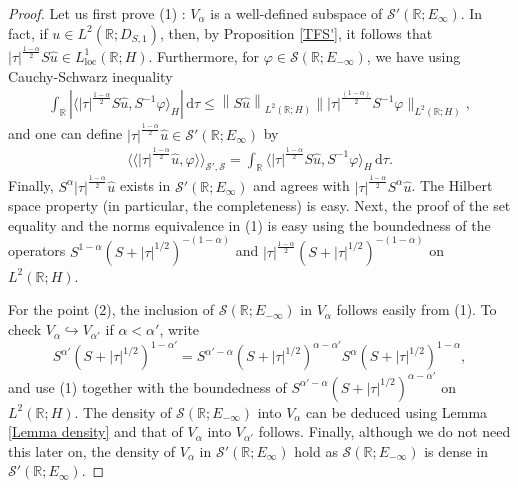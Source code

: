 \documentclass[11pt, letterpaper]{amsart}
\theoremstyle{definition}
\theoremstyle{remark}
\newcommand{\llangle}{\langle\!\langle}
\newcommand{\rrangle}{\rangle\!\rangle}
\numberwithin{equation}{section}
\begin{document}
\begin{proof} Let us first prove (1) : $V_\alpha $ is a well-defined  subspace of  $\mathcal{S'}(\mathbb{R};E_\infty)$. In fact, if $u \in L^2(\mathbb{R};D_{S,1})$, then, by Proposition \ref{TFS'}, it follows that $ \left | \tau  \right |^{\frac{1-\alpha}{2}} S \hat{u} \in L^1_{\mathrm{loc}}(\mathbb{R};H)$. Furthermore, for $\varphi \in \mathcal{S}(\mathbb{R};E_{-\infty})$, we have using Cauchy-Schwarz inequality
\begin{align*}
     \int_{\mathbb{R}}  |\langle \left | \tau  \right |^{\frac{1-\alpha}{2}} S\hat{u}, S^{-1 }\varphi  \rangle_H |\, \mathrm d \tau  \leq \left \| S\hat{u} \right \|_{L^2(\mathbb{R};H)}   \||\tau|^{\frac{(1-\alpha)}{2}}  S^{-1 }\varphi   \|_{L^2(\mathbb{R};H)} , 
\end{align*}
and one can define $\left | \tau  \right |^{{\frac{1-\alpha}{2}}}\hat u \in \mathcal{S'}(\mathbb{R};E_\infty)$ by
\begin{align*}
 \llangle \left | \tau  \right |^{\frac{1-\alpha}{2}}\hat u, \varphi  \rrangle_{\mathcal{S'},\mathcal{S}} =  \int_{\mathbb{R}}  \langle \left | \tau  \right |^{\frac{1-\alpha}{2}} S\hat{u}, S^{-1 }\varphi  \rangle_H\,  \mathrm d \tau . 
\end{align*}
Finally, $ S^\alpha\left | \tau  \right |^{{\frac{1-\alpha}{2}}}\hat u$ exists in $\mathcal{S'}(\mathbb{R};E_\infty)$ and agrees with $ \left | \tau  \right |^{{\frac{1-\alpha}{2}}}S^\alpha\hat u$. The Hilbert space property (in particular, the completeness) is easy.
Next, the proof of the set equality and the norms equivalence in (1) is easy using the boundedness of the operators $S^{1-\alpha}(S+\left | \tau \right |^{1/2})^{-(1-\alpha)}$ and $|\tau|^{\frac{1-\alpha }2}(S+\left | \tau \right |^{1/2})^{-(1-\alpha)}$ on $L^2(\mathbb{R};H)$.
    

For the  point (2),  the inclusion of $\mathcal{S}(\mathbb{R};E_{-\infty})$ in $V_\alpha$ follows easily from (1). To check $V_\alpha \hookrightarrow V_{\alpha'}$ if $\alpha<\alpha'$, write
\begin{equation*}
    S^{\alpha'} (S+\left | \tau \right |^{1/2})^{1-\alpha'}=S^{\alpha'-\alpha}(S+\left | \tau \right|^{1/2})^{\alpha-\alpha'} S^\alpha (S+\left | \tau \right |^{1/2})^{1-\alpha},
\end{equation*}
and use (1) together with the boundedness of $S^{\alpha'-\alpha}(S+\left | \tau \right|^{1/2})^{\alpha-\alpha'}$ on $ L^2(\mathbb{R};H)$. The density of $\mathcal{S}(\mathbb{R};E_{-\infty})$ into $V_\alpha$ can be deduced using Lemma \ref{Lemma density} and that of $V_\alpha$ into $V_{\alpha'}$ follows. Finally, although we do not need this later on, the density of $V_\alpha$ in $\mathcal{S'}(\mathbb{R};E_{\infty})$ hold as $\mathcal{S}(\mathbb{R};E_{-\infty})$ is dense in $\mathcal{S'}(\mathbb{R};E_\infty)$. 


\end{proof}
\end{document}
